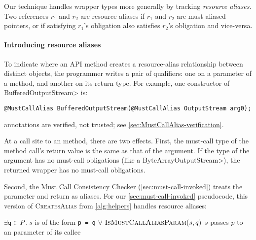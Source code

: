 Our technique handles wrapper types more generally by tracking \emph{resource
aliases}.  Two references $r_1$ and $r_2$ are resource aliases
if $r_1$ and $r_2$ are must-aliased pointers, or if
satisfying $r_1$'s \MustCall obligation also satisfies $r_2$'s
  obligation and vice-versa.

\paragraph{Introducing resource aliases}
To indicate where an API method creates a resource-alias
relationship between distinct objects, the programmer writes a pair of 
\MustCallAlias qualifiers:  one on a parameter
of a method, and another on its return type.
For example, one constructor of \<BufferedOutputStream> is:
\begin{lstlisting}[aboveskip=0.5em,belowskip=0.5em]
@MustCallAlias BufferedOutputStream(@MustCallAlias OutputStream arg0);
\end{lstlisting}
\noindent
\MustCallAlias annotations are verified, not trusted; see \cref{sec:MustCallAlias-verification}.

At a call site to an \MustCallAlias method, there are two effects.
First, the must-call type of the method call's return value
is the same as that of the \MustCallAlias
argument.  If the type of the argument has no must-call obligations (like a
\<ByteArrayOutputStream>), the returned wrapper has no must-call
obligations.

Second,
the Must Call Consistency Checker
(\cref{sec:must-call-invoked}) treats the \MustCallAlias parameter and return as
aliases.  For our \cref{sec:must-call-invoked} pseudocode, this
version of \textsc{CreatesAlias} from \cref{alg:helpers} handles resource aliases:
\begin{algorithmic}
    \State \Return $\exists \mathtt{q} \in P\ .\ s$ is of the form \texttt{p = q}\newline
         \hspace*{8em} $\vee\ \textsc{IsMustCallAliasParam}(s,q)$ 
  \EndProcedure
    \State \Return $s$ passes $p$ to an \MustCallAlias parameter of its callee
  \EndProcedure
\end{algorithmic}


